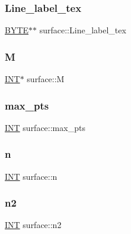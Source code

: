 \mbox{\label{classsurface_ae6d4aed426c13bcd35a91717c30b58c6}} 
\subsubsection{\texorpdfstring{Line\+\_\+label\+\_\+tex}{Line\_label\_tex}}
{\footnotesize\ttfamily \mbox{\hyperlink{galois_8h_ab6cc7b4aeb6ea31aba2b3fbfc83ff5e6}{B\+Y\+TE}}$\ast$$\ast$ surface\+::\+Line\+\_\+label\+\_\+tex}

\mbox{\label{classsurface_a5e49a031d7c0e2eb9350eabce11b3245}} 
\subsubsection{\texorpdfstring{M}{M}}
{\footnotesize\ttfamily \mbox{\hyperlink{galois_8h_a09fddde158a3a20bd2dcadb609de11dc}{I\+NT}}$\ast$ surface\+::M}

\mbox{\label{classsurface_a3fc82490c00fbd3e210f087200e7a947}} 
\subsubsection{\texorpdfstring{max\+\_\+pts}{max\_pts}}
{\footnotesize\ttfamily \mbox{\hyperlink{galois_8h_a09fddde158a3a20bd2dcadb609de11dc}{I\+NT}} surface\+::max\+\_\+pts}

\mbox{\label{classsurface_ae1914ab225ba1a719395e88f67dd0d8c}} 
\subsubsection{\texorpdfstring{n}{n}}
{\footnotesize\ttfamily \mbox{\hyperlink{galois_8h_a09fddde158a3a20bd2dcadb609de11dc}{I\+NT}} surface\+::n}

\mbox{\label{classsurface_a2738edc2db856f38fbd86c7f97ea3cdf}} 
\subsubsection{\texorpdfstring{n2}{n2}}
{\footnotesize\ttfamily \mbox{\hyperlink{galois_8h_a09fddde158a3a20bd2dcadb609de11dc}{I\+NT}} surface\+::n2}

